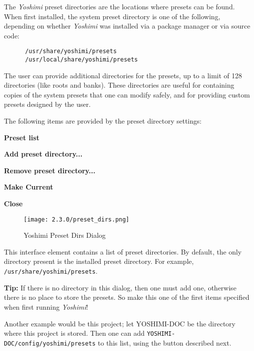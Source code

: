    The \textsl{Yoshimi} preset directories are the locations where
   presets can be found.  When first installed, the system
   preset directory is one of the following, depending on whether
   \textsl{Yoshimi} was installed via a package manager or via source code:

   \begin{verbatim}
      /usr/share/yoshimi/presets
      /usr/local/share/yoshimi/presets
   \end{verbatim}

   The user can provide additional directories for the presets, up to a
   limit of 128 directories (like roots and banks).
   These directories are useful for containing copies of the system
   presets that one can modify safely, and for providing custom
   presets designed by the user.

   The following items are provided by the preset directory settings:

   \begin{enumber}
      \item \textbf{Preset list}
      \item \textbf{Add preset directory...}
      \item \textbf{Remove preset directory...}
      \item \textbf{Make Current}
      \item \textbf{Close}
   \end{enumber}

\begin{figure}[H]
   \centering
   \texttt{[image: 2.3.0/preset\_dirs.png]}
   \caption[Preset Dirs Tab]{Yoshimi Preset Dirs Dialog}
   \label{fig:yoshimi_presets_dirs_tab}
\end{figure}

   \setcounter{ItemCounter}{0}      %

   This interface element contains a list of preset directories.
   By default, the only directory present is the installed preset directory.
   For example, \texttt{/usr/share/yoshimi/presets}.

   \textbf{Tip:}
   If there is no directory in this dialog, then one must
   add one, otherwise there is no place to store the presets.
   So make this one of the first items specified when first running
   \textsl{Yoshimi}!

   Another example would be this project; let YOSHIMI-DOC be the directory
   where this project is stored.  Then one can add
   \texttt{YOSHIMI-DOC/config/yoshimi/presets} to this list, using the
   button described next.

